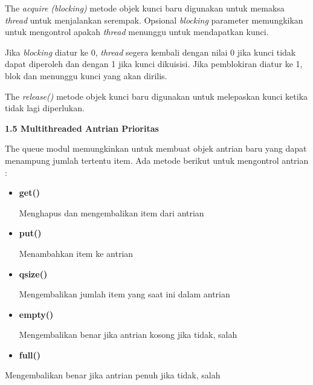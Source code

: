 \documentclass[a4paper,12pt]{report}
\begin{document}
The \textit{acquire}\textit{ }\textit{(blocking)}\textit{ }metode objek kunci baru digunakan untuk memaksa \textit{thread}\textit{ }untuk menjalankan serempak. Opsional \textit{blocking} parameter memungkikan untuk mengontrol apakah\textit{ thread} menunggu untuk mendapatkan kunci. \par
Jika \textit{blocking} diatur ke 0, \textit{thread} segera kembali dengan nilai 0 jika kunci tidak dapat diperoleh dan dengan 1 jika kunci dikuisisi. Jika pemblokiran diatur ke 1, blok dan menunggu kunci yang akan dirilis. \par
The \textit{release()} metode objek kunci baru digunakan untuk melepaskan kunci ketika tidak lagi diperlukan.  \par
\vspace{12pt}
\vspace{12pt}
\vspace{12pt}
\textbf{1.5 Multithreaded Antrian Prioritas} \par
The queue modul memungkinkan untuk membuat objek antrian baru yang dapat menampung jumlah tertentu item. Ada metode berikut untuk mengontrol antrian : \par
\begin{itemize}
\item \textbf{get()} \par
\begin{adjustwidth}{1.0in}{-0.5in}
Menghapus dan mengembalikan item dari antrian\end{adjustwidth}
 \par
\item \textbf{put()} \par
\begin{adjustwidth}{1.0in}{-0.5in}
Menambahkan item ke antrian\end{adjustwidth}
 \par
\item \textbf{qsize()} \par
\begin{adjustwidth}{1.0in}{-0.5in}
Mengembalikan jumlah item yang saat ini dalam antrian\end{adjustwidth}
 \par
\item \textbf{empty()} \par
\begin{adjustwidth}{1.0in}{-0.5in}
Mengembalikan benar jika antrian kosong jika tidak, salah\end{adjustwidth}
 \par
\item \textbf{full()}\end{itemize}
 \par
\begin{adjustwidth}{1.0in}{-0.5in}
Mengembalikan benar jika antrian penuh jika tidak, salah\end{adjustwidth}
 \par
\vspace{12pt}
\vspace{12pt}
\end{document}
